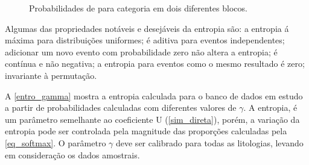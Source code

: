 \begin{figure} 
\caption{Probabilidades de para categoria em dois diferentes blocos.} \label{entro_block}
     \centering
\end{figure}

Algumas das propriedades notáveis e desejáveis da entropia são: a entropia á máxima para distribuições uniformes; é aditiva para eventos independentes; adicionar um novo evento com probabilidade zero não altera a entropia; é contínua e não negativa; a entropia para eventos como o mesmo resultado é zero; invariante à permutação.

A \autoref{entro_gamma} mostra a entropia calculada para o banco de dados em estudo a partir de probabilidades calculadas com diferentes valores de $\gamma$. A entropia, é um parâmetro semelhante ao coeficiente U (\autoref{sim_direta}), porém, a variação da entropia pode ser controlada pela magnitude das proporções calculadas pela \autoref{eq_softmax}. O parâmetro $\gamma$ deve ser calibrado para todas as litologias, levando em consideração os dados amostrais. 

